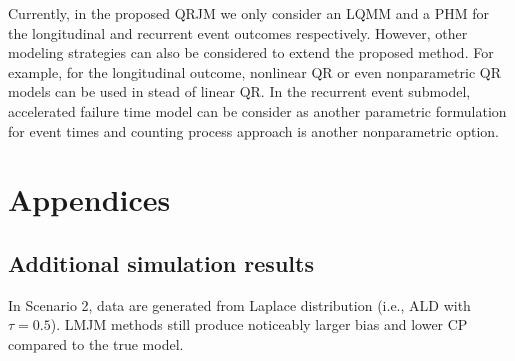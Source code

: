 Currently, in the proposed QRJM we only consider an LQMM and a PHM for the longitudinal and recurrent event outcomes respectively. However, other modeling strategies can also be considered to extend the proposed method. For example, for the longitudinal outcome, nonlinear QR \citep{koenker1996interior} or even nonparametric QR \citep{le2005nonparametric} models can be used in stead of linear QR. In the recurrent event submodel, accelerated failure time model can be consider as another parametric formulation for event times and counting process approach is another nonparametric option.



\section*{Appendices}
\renewcommand{\thesubsection}{\Alph{subsection}}
\subsection{Additional simulation results}\label{sec:p2appendix_simulation}
In Scenario 2, data are generated from Laplace distribution (i.e., ALD with $\tau=0.5$). LMJM methods still produce noticeably larger bias and lower CP compared to the true model.

